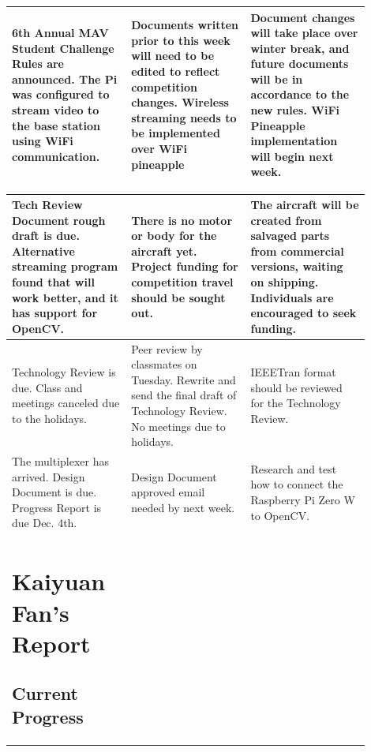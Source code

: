 \documentclass[onecolumn, draftclsnofoot,10pt, compsoc]{IEEEtran}
\begin{document}
\begin{center}
\begin{tabular}{|p{0.3\linewidth}|p{0.3\linewidth}|p{0.3\linewidth}|}
		\hline
         6th Annual MAV Student Challenge Rules are announced. The Pi was configured to stream video to the base station using WiFi communication. & Documents written prior to this week will need to be edited to reflect competition changes. Wireless streaming needs to be implemented over WiFi pineapple & Document changes will take place over winter break, and future documents will be in accordance to the new rules. WiFi Pineapple implementation will begin next week. \\
		\hline
    \end{tabular}
\end{center}

\begin{center}
    \begin{tabular}{|p{0.3\linewidth}|p{0.3\linewidth}|p{0.3\linewidth}|}
        		\hline
        Tech Review Document rough draft is due. Alternative streaming program found that will work better, and it has support for OpenCV. & There is no motor or body for the aircraft yet. Project funding for competition travel should be sought out. & The aircraft will be created from salvaged parts from commercial versions, waiting on shipping. Individuals are encouraged to seek funding. \\
		\hline
         Technology Review is due. Class and meetings canceled due to the holidays. & Peer review by classmates on Tuesday. Rewrite and send the final draft of Technology Review. No meetings due to holidays. & IEEETran format should be reviewed for the Technology Review.\\
		\hline
         The multiplexer has arrived. Design Document is due. Progress Report is due Dec. 4th. & Design Document approved email needed by next week. & Research and test how to connect the Raspberry Pi Zero W to OpenCV.   \\

\section{Kaiyuan Fan's Report}


\subsection{Current Progress}



\end{tabular}
\end{center}
\end{document}
